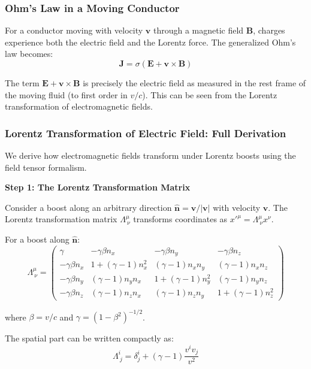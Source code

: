 \documentclass[12pt,a4paper]{article}
\begin{document}
\subsubsection{Ohm's Law in a Moving Conductor}

For a conductor moving with velocity $\bm{v}$ through a magnetic field $\bm{B}$,
charges experience both the electric field and the Lorentz force. The generalized
Ohm's law becomes:
\begin{equation}
\bm{J} = \sigma (\bm{E} + \bm{v} \times \bm{B})
\label{eq:ohms_law_moving}
\end{equation}

The term $\bm{E} + \bm{v} \times \bm{B}$ is precisely the electric field as measured
in the rest frame of the moving fluid (to first order in $v/c$). This can be seen
from the Lorentz transformation of electromagnetic fields.

\subsubsection{Lorentz Transformation of Electric Field: Full Derivation}

We derive how electromagnetic fields transform under Lorentz boosts using the
field tensor formalism.

\textbf{Step 1: The Lorentz Transformation Matrix}

Consider a boost along an arbitrary direction $\hat{\bm{n}} = \bm{v}/|\bm{v}|$
with velocity $\bm{v}$. The Lorentz transformation matrix $\Lambda^\mu_{\ \nu}$
transforms coordinates as $x'^\mu = \Lambda^\mu_{\ \nu} x^\nu$.

For a boost along $\hat{\bm{n}}$:
\begin{equation}
\Lambda^\mu_{\ \nu} = \begin{pmatrix}
\gamma & -\gamma \beta n_x & -\gamma \beta n_y & -\gamma \beta n_z \\
-\gamma \beta n_x & 1 + (\gamma-1)n_x^2 & (\gamma-1)n_x n_y & (\gamma-1)n_x n_z \\
-\gamma \beta n_y & (\gamma-1)n_y n_x & 1 + (\gamma-1)n_y^2 & (\gamma-1)n_y n_z \\
-\gamma \beta n_z & (\gamma-1)n_z n_x & (\gamma-1)n_z n_y & 1 + (\gamma-1)n_z^2
\end{pmatrix}
\label{eq:lorentz_matrix}
\end{equation}

where $\beta = v/c$ and $\gamma = (1-\beta^2)^{-1/2}$.

The spatial part can be written compactly as:
\begin{equation}
\Lambda^i_{\ j} = \delta^i_j + (\gamma - 1)\frac{v^i v_j}{v^2}
\label{eq:lorentz_spatial}
\end{equation}
\end{document}
